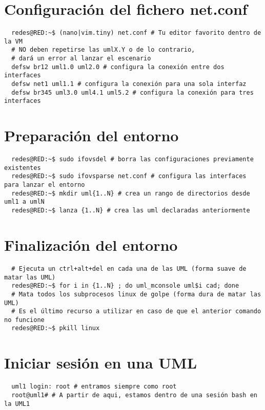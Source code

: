 \documentclass{article}
\begin{document}
\tableofcontents
\newpage

\section{Configuración del fichero net.conf}
\begin{verbatim}
  redes@RED:~$ (nano|vim.tiny) net.conf # Tu editor favorito dentro de la VM
  # NO deben repetirse las umlX.Y o de lo contrario,
  # dará un error al lanzar el escenario
  defsw br12 uml1.0 uml2.0 # configura la conexión entre dos interfaces
  defsw net1 uml1.1 # configura la conexión para una sola interfaz
  defsw br345 uml3.0 uml4.1 uml5.2 # configura la conexión para tres interfaces
\end{verbatim}

\section{Preparación del entorno}
\begin{verbatim}
  redes@RED:~$ sudo ifovsdel # borra las configuraciones previamente existentes
  redes@RED:~$ sudo ifovsparse net.conf # configura las interfaces para lanzar el entorno
  redes@RED:~$ mkdir uml{1..N} # crea un rango de directorios desde uml1 a umlN
  redes@RED:~$ lanza {1..N} # crea las uml declaradas anteriormente
\end{verbatim}

\section{Finalización del entorno}
\begin{verbatim}
  # Ejecuta un ctrl+alt+del en cada una de las UML (forma suave de matar las UML)
  redes@RED:~$ for i in {1..N} ; do uml_mconsole uml$i cad; done
  # Mata todos los subprocesos linux de golpe (forma dura de matar las UML)
  # Es el último recurso a utilizar en caso de que el anterior comando no funcione
  redes@RED:~$ pkill linux
\end{verbatim}

\section{Iniciar sesión en una UML}
\begin{verbatim}
  uml1 login: root # entramos siempre como root
  root@uml1# # A partir de aqui, estamos dentro de una sesión bash en la UML1
\end{verbatim}
\end{document}
